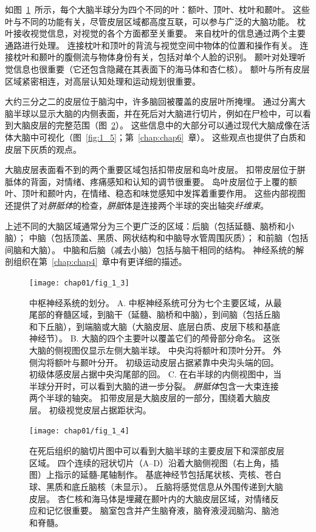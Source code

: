 \begin{proposition}[中枢神经系统的解剖学组织]
	\quad \quad 如图~\ref{fig:1_3}~所示，每个大脑半球分为四个不同的叶：额叶、顶叶、枕叶和颞叶。
	这些叶与不同的功能有关，尽管皮层区域都高度互联，可以参与广泛的大脑功能。
	枕叶接收视觉信息，对视觉的各个方面都至关重要。
	来自枕叶的信息通过两个主要通路进行处理。
	连接枕叶和顶叶的背流与视觉空间中物体的位置和操作有关。
	连接枕叶和颞叶的腹侧流与物体身份有关，包括对单个人脸的识别。
	颞叶对处理听觉信息也很重要（它还包含隐藏在其表面下的海马体和杏仁核）。
	额叶与所有皮层区域紧密相连，对高层认知处理和运动规划很重要。
	
	\quad \quad 大约三分之二的皮层位于脑沟中，许多脑回被覆盖的皮层叶所掩埋。
	通过分离大脑半球以显示大脑的内侧表面，并在死后对大脑进行切片，例如在尸检中，可以看到大脑皮层的完整范围（图~\ref{fig:1_4}）。
	这些信息中的大部分可以通过现代大脑成像在活体大脑中可视化（图~\ref{fig:1_5}；第~\ref{chap:chap6}~章）。
	这些观点也提供了白质和皮层下灰质的观点。
	
	\quad \quad 大脑皮层表面看不到的两个重要区域包括扣带皮层和岛叶皮层。
	扣带皮层位于胼胝体的背面，对情绪、疼痛感知和认知的调节很重要。
	岛叶皮层位于上覆的额叶、顶叶和颞叶内，在情绪、稳态和味觉感知中发挥着重要作用。
	这些内部视图还提供了对\textit{胼胝体}的检查，\textit{胼胝}体是连接两个半球的突出轴突\textit{纤维束}。
	
	上述不同的大脑区域通常分为三个更广泛的区域：后脑（包括延髓、脑桥和小脑）；
	中脑（包括顶盖、黑质、网状结构和中脑导水管周围灰质）；
	和前脑（包括间脑和大脑）。
	中脑和后脑（减去小脑）包括与脑干相同的结构。
	神经系统的解剖组织在第~\ref{chap:chap4}~章中有更详细的描述。
		
\end{proposition}


\begin{figure}[htbp]
	\centering
	\texttt{[image: chap01/fig\_1\_3]}
	\caption{中枢神经系统的划分。
		A. 中枢神经系统可分为七个主要区域，从最尾部的脊髓区域，到脑干（延髓、脑桥和中脑），到间脑（包括丘脑和下丘脑），到端脑或大脑（大脑皮层、底层白质、皮层下核和基底神经节）。
		B. 大脑的四个主要叶以覆盖它们的颅骨部分命名。
		这张大脑的侧视图仅显示左侧大脑半球。
		中央沟将额叶和顶叶分开。
		外侧沟将额叶与颞叶分开。
		初级运动皮层占据紧靠中央沟头端的回。
		初级体感皮层占据中央沟尾部的回。
		C. 在右半球的内侧视图中，当半球分开时，可以看到大脑的进一步分裂。
		\textit{胼胝体}包含一大束连接两个半球的轴突。
		扣带皮层是大脑皮层的一部分，围绕着大脑皮层。
		初级视觉皮层占据距状沟。}
	\label{fig:1_3}
\end{figure}


\begin{figure}[htbp]
	\centering
	\texttt{[image: chap01/fig\_1\_4]}
	\caption{在死后组织的脑切片图中可以看到大脑半球的主要皮层下和深部皮层区域。
		四个连续的冠状切片（A–D）沿着大脑侧视图（右上角，插图）上指示的延髓-尾轴制作。
		基底神经节包括尾状核、壳核、苍白球、黑质和底丘脑核（未显示）。
		丘脑将感觉信息从外围传递到大脑皮层。
		杏仁核和海马体是埋藏在颞叶内的大脑皮层区域，对情绪反应和记忆很重要。
		脑室包含并产生脑脊液，脑脊液浸润脑沟、脑池和脊髓\cite{nieuwenhuys2007human}。}
	\label{fig:1_4}
\end{figure}


